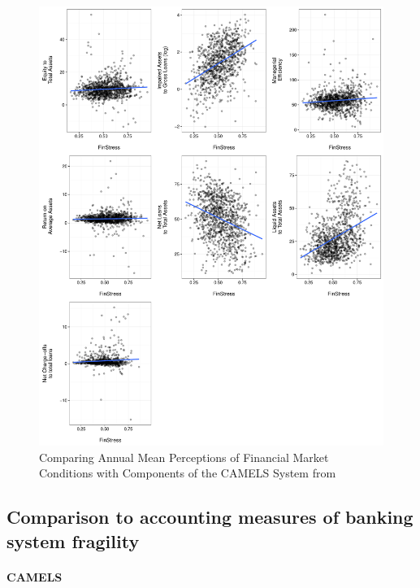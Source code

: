 \documentclass[]{article}
\begin{document}
\begin{figure}
	\caption{Comparing Annual Mean Perceptions of Financial Market Conditions with Components of the CAMELS System from \cite{Andrianova2015}}
    \label{camel_plot}
    \begin{center}
		\includegraphics[scale=0.55]{figures/fin_fragility_compare.pdf}
	\end{center}
\end{figure}

\subsection{Comparison to accounting measures of banking system fragility}

\paragraph{CAMELS}
\end{document}
